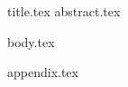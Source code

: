 \documentclass[11pt]{llncs}
\begin{document}
{title.tex}
{abstract.tex}

\thispagestyle{plain}

{body.tex}




\appendix
{appendix.tex}
\end{document}
